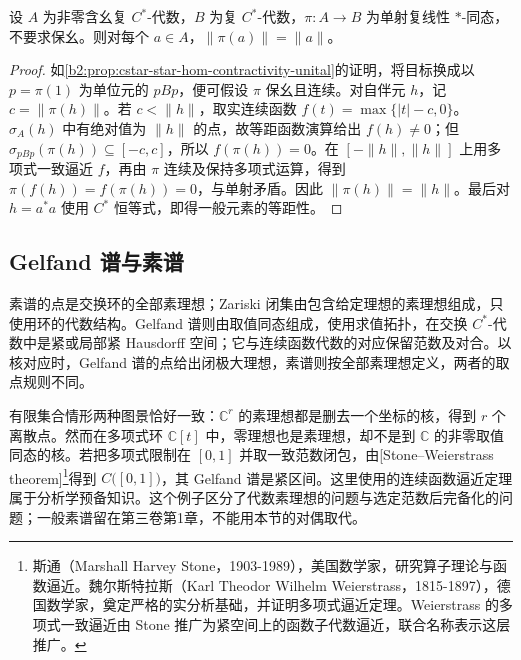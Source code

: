 \begin{proposition}[单射同态的等距性]\label{b2:prop:cstar-star-hom-isometry-unital}
	设 \(A\) 为非零含幺复 \(C^*\)-代数，\(B\) 为复 \(C^*\)-代数，\(\pi:A\to B\) 为单射复线性 \(*\)-同态，不要求保幺。则对每个 \(a\in A\)，\(\|\pi(a)\|=\|a\|\)。
\end{proposition}

\begin{proof}
	如\cref{b2:prop:cstar-star-hom-contractivity-unital}的证明，将目标换成以 \(p=\pi(1)\) 为单位元的 \(pBp\)，便可假设 \(\pi\) 保幺且连续。对自伴元 \(h\)，记 \(c=\|\pi(h)\|\)。若 \(c<\|h\|\)，取实连续函数 \(f(t)=\max\{|t|-c,0\}\)。\(\sigma_A(h)\) 中有绝对值为 \(\|h\|\) 的点，故等距函数演算给出 \(f(h)\ne0\)；但 \(\sigma_{pBp}(\pi(h))\subseteq[-c,c]\)，所以 \(f(\pi(h))=0\)。在 \([-\|h\|,\|h\|]\) 上用多项式一致逼近 \(f\)，再由 \(\pi\) 连续及保持多项式运算，得到 \(\pi(f(h))=f(\pi(h))=0\)，与单射矛盾。因此 \(\|\pi(h)\|=\|h\|\)。最后对 \(h=a^*a\) 使用 \(C^*\) 恒等式，即得一般元素的等距性。
\end{proof}

\subsection{Gelfand 谱与素谱}
\label{b2:subsec:D02:03}

素谱的点是交换环的全部素理想；Zariski 闭集由包含给定理想的素理想组成，只使用环的代数结构。Gelfand 谱则由取值同态组成，使用求值拓扑，在交换 \(C^*\)-代数中是紧或局部紧 Hausdorff 空间；它与连续函数代数的对应保留范数及对合。以核对应时，Gelfand 谱的点给出闭极大理想，素谱则按全部素理想定义，两者的取点规则不同。

\ProseParagraphBreak
有限集合情形两种图景恰好一致：\(\mathbb C^r\) 的素理想都是删去一个坐标的核，得到 \(r\) 个离散点。然而在多项式环 \(\mathbb C[t]\) 中，零理想也是素理想，却不是到 \(\mathbb C\) 的非零取值同态的核。若把多项式限制在 \([0,1]\) 并取一致范数闭包，由[Stone--Weierstrass theorem]\footnote{斯通（Marshall Harvey Stone，1903-1989），美国数学家，研究算子理论与函数逼近。魏尔斯特拉斯（Karl Theodor Wilhelm Weierstrass，1815-1897），德国数学家，奠定严格的实分析基础，并证明多项式逼近定理。Weierstrass 的多项式一致逼近由 Stone 推广为紧空间上的函数子代数逼近，联合名称表示这层推广。}得到 \(C\bigl([0,1]\bigr)\)，其 Gelfand 谱是紧区间。这里使用的连续函数逼近定理属于分析学预备知识。这个例子区分了代数素理想的问题与选定范数后完备化的问题；一般素谱留在第三卷第1章，不能用本节的对偶取代。
